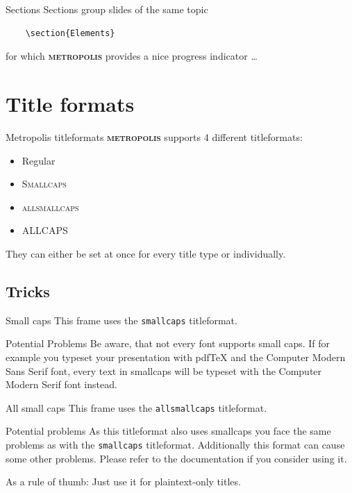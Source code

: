 \documentclass[10pt]{beamer}
\newcommand{\themename}{\textbf{\textsc{metropolis}}\xspace}
\begin{document}
\begin{frame}[fragile]{Sections}
  Sections group slides of the same topic

  \begin{verbatim}    \section{Elements}\end{verbatim}

  for which \themename provides a nice progress indicator \ldots
  
\end{frame}



\section{Title formats}

\begin{frame}{Metropolis titleformats}
	\themename supports 4 different titleformats:
	\begin{itemize}
		\item Regular
		\item \textsc{Smallcaps}
		\item \textsc{allsmallcaps}
		\item ALLCAPS
	\end{itemize}
	They can either be set at once for every title type or individually.
\end{frame}

\subsection{Tricks}

{
\begin{frame}{Small caps}
	This frame uses the \texttt{smallcaps} titleformat.

	\begin{alertblock}{Potential Problems}
		Be aware, that not every font supports small caps. If for example you typeset your presentation with pdfTeX and the Computer Modern Sans Serif font, every text in smallcaps will be typeset with the Computer Modern Serif font instead.
	\end{alertblock}
\end{frame}
}

{
\begin{frame}{All small caps}
	This frame uses the \texttt{allsmallcaps} titleformat.

	\begin{alertblock}{Potential problems}
		As this titleformat also uses smallcaps you face the same problems as with the \texttt{smallcaps} titleformat. Additionally this format can cause some other problems. Please refer to the documentation if you consider using it.

		As a rule of thumb: Just use it for plaintext-only titles.
	\end{alertblock}
\end{frame}
}
\end{document}
